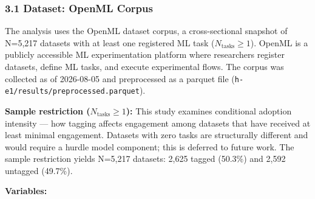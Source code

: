 
\subsubsection{3.1 Dataset: OpenML Corpus}

The analysis uses the OpenML dataset corpus, a cross-sectional snapshot of N=5,217 datasets with at least one registered ML task ($N_{\text{tasks}}\geq 1$). OpenML \citep{Vanschoren2014OpenML} is a publicly accessible ML experimentation platform where researchers register datasets, define ML tasks, and execute experimental flows. The corpus was collected as of 2026-08-05 and preprocessed as a parquet file (\texttt{h-e1/results/preprocessed.parquet}).

\textbf{Sample restriction ($N_{\text{tasks}}\geq 1$):} This study examines conditional adoption intensity --- how tagging affects engagement among datasets that have received at least minimal engagement. Datasets with zero tasks are structurally different and would require a hurdle model component; this is deferred to future work. The sample restriction yields N=5,217 datasets: 2,625 tagged (50.3\%) and 2,592 untagged (49.7\%).

\textbf{Variables:}

\begin{table}[htbp]
\centering
{}
\end{table}

